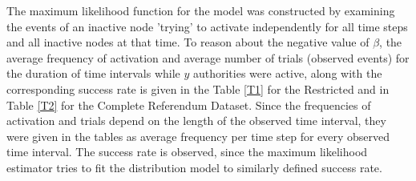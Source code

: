 \documentclass[times, utf8, zavrsni]{fer}
\begin{document}
The maximum likelihood function for the model was constructed by examining the events of an inactive node 'trying' to activate independently for all time steps and all inactive nodes at that time. To reason about the negative value of $\beta$, the average frequency of activation and average number of trials (observed events) for the duration of time intervals while $y$ authorities were active, along with the corresponding success rate is given in the Table \ref{T1} for the Restricted and in Table \ref{T2} for the Complete Referendum Dataset. Since the frequencies of activation and trials depend on the length of the observed time interval, they were given in the tables as average frequency per time step for every observed time interval. The success rate is observed, since the maximum likelihood estimator tries to fit the distribution model to similarly defined success rate.
\end{document}
